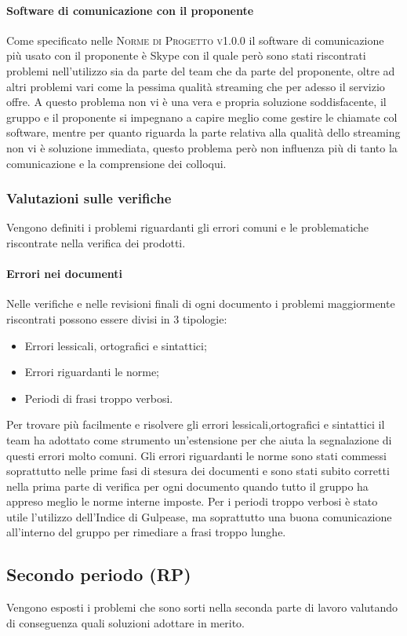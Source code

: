 \documentclass[../piano-di-qualifica.tex]{subfiles}
\begin{document}
\paragraph{Software di comunicazione con il proponente}
\label{sub:latex}
Come specificato nelle \textsc{Norme di Progetto v1.0.0} il software di comunicazione più usato con il proponente è Skype con il quale però sono stati riscontrati problemi nell'utilizzo sia da parte del team che da parte del proponente, oltre ad altri problemi vari come la pessima qualità streaming che per adesso il servizio offre.
A questo problema non vi è una vera e propria soluzione soddisfacente, il gruppo e il proponente si impegnano a capire meglio come gestire le chiamate col software, mentre per quanto riguarda la parte relativa alla qualità dello streaming non vi è soluzione immediata, questo problema però non influenza più di tanto la comunicazione e la comprensione dei colloqui.

\subsubsection{Valutazioni sulle verifiche}
\label{sub:valutazioni_verifiche}
Vengono definiti i problemi riguardanti gli errori comuni e le problematiche riscontrate nella verifica dei prodotti.

\paragraph{Errori nei documenti}
\label{sub:errori_documenti}
Nelle verifiche e nelle revisioni finali di ogni documento i problemi maggiormente riscontrati possono essere divisi in 3 tipologie:
\begin{itemize}
    \item Errori lessicali, ortografici e sintattici;
    \item Errori riguardanti le norme;
    \item Periodi di frasi troppo verbosi.
\end{itemize}
Per trovare più facilmente e risolvere gli errori lessicali,ortografici e sintattici il team ha adottato come strumento un'estensione per  che aiuta la segnalazione di questi errori molto comuni.
Gli errori riguardanti le norme sono stati commessi soprattutto nelle prime fasi di stesura dei documenti e sono stati subito corretti nella prima parte di verifica per ogni documento quando tutto il gruppo ha appreso meglio le norme interne imposte.
Per i periodi troppo verbosi è stato utile l'utilizzo dell'Indice di Gulpease, ma soprattutto una buona comunicazione all'interno del gruppo per rimediare a frasi troppo lunghe.

\subsection{Secondo periodo (RP)}
Vengono esposti i problemi che sono sorti nella seconda parte di lavoro valutando di conseguenza quali soluzioni adottare in merito.
\end{document}
